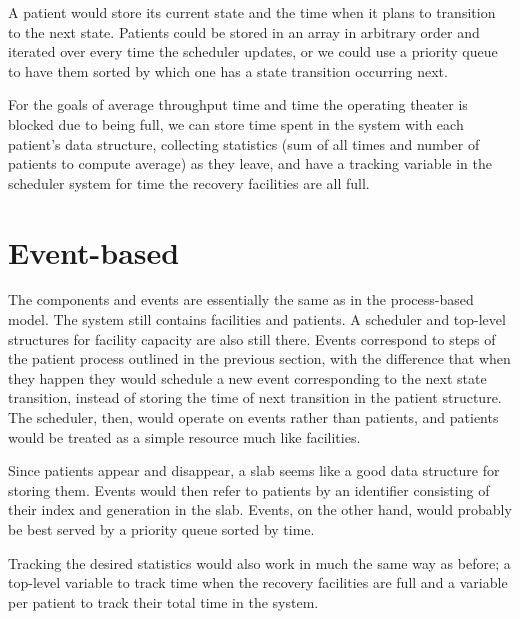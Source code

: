 \documentclass{article}
\begin{document}
A patient would store its current state and the time when it plans to
transition to the next state. Patients could be stored in an array in arbitrary
order and iterated over every time the scheduler updates, or we could use a
priority queue to have them sorted by which one has a state transition
occurring next.

For the goals of average throughput time and time the operating theater is
blocked due to being full, we can store time spent in the system with each
patient's data structure, collecting statistics (sum of all times and number of
patients to compute average) as they leave, and have a tracking variable in the
scheduler system for time the recovery facilities are all full.

\section*{Event-based}

The components and events are essentially the same as in the process-based model.
The system still contains facilities and patients. A scheduler and top-level
structures for facility capacity are also still there. Events correspond to
steps of the patient process outlined in the previous section, with the
difference that when they happen they would schedule a new event corresponding
to the next state transition, instead of storing the time of next transition
in the patient structure. The scheduler, then, would operate on events rather
than patients, and patients would be treated as a simple resource much like
facilities.

Since patients appear and disappear, a slab seems like a good data structure
for storing them. Events would then refer to patients by an identifier
consisting of their index and generation in the slab.
Events, on the other hand, would probably be best served by a priority queue
sorted by time.

Tracking the desired statistics would also work in much the same way as before;
a top-level variable to track time when the recovery facilities are full and a
variable per patient to track their total time in the system.
\end{document}
